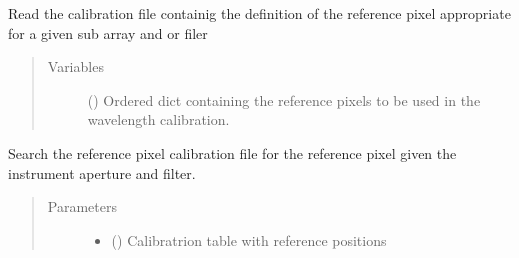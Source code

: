 \documentclass[a4paper,10pt,english]{sphinxmanual}
\begin{document}
\begin{fulllineitems}
\begin{fulllineitems}
\begin{quote}
\begin{description}
\end{description}\end{quote}

\end{fulllineitems}


\begin{fulllineitems}
\label{\detokenize{cascade.instruments:cascade.instruments.instruments.HSTWFC3._read_reference_pixel_file}}
Read the calibration file containig the definition
of the reference pixel appropriate for a given sub array and or filer
\begin{quote}\begin{description}
\item[{Variables}] \leavevmode
{} () \textendash{} Ordered dict containing the reference pixels to be used in the
wavelength calibration.

\end{description}\end{quote}

\end{fulllineitems}


\begin{fulllineitems}
\label{\detokenize{cascade.instruments:cascade.instruments.instruments.HSTWFC3._search_ref_pixel_cal_file}}
Search the reference pixel calibration file for the reference pixel
given the instrument aperture and filter.
\begin{quote}\begin{description}
\item[{Parameters}] \leavevmode\begin{itemize}
\item {} 
 () \textendash{} Calibratrion table with reference positions


\end{itemize}
\end{description}
\end{quote}
\end{fulllineitems}
\end{fulllineitems}
\end{document}
